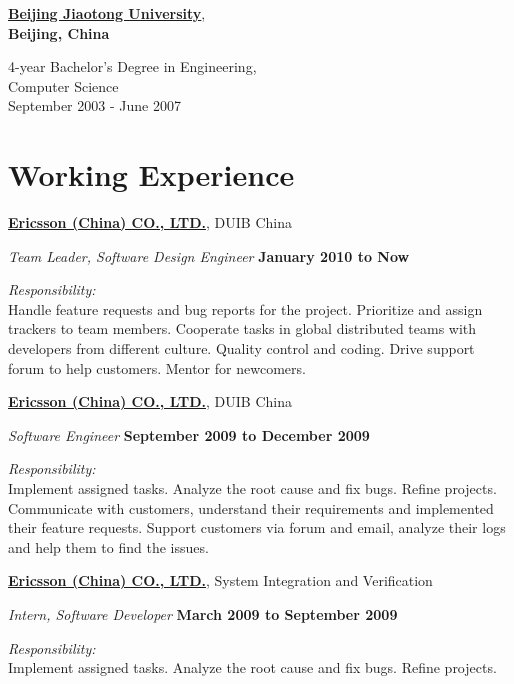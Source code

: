 \href{http://www.njtu.edu.cn/en/}{\textbf{Beijing Jiaotong University}},\\
\textbf{Beijing, China}
\begin{outerlist}
\item[] 4-year Bachelor's Degree in Engineering, \\
        {Computer Science}\\
        September 2003 - June 2007
\end{outerlist}       

%
\section{Working Experience}
\href{http://www.ericsson.com/cn}{\textbf{Ericsson (China) CO., LTD.}}, {DUIB China}
\begin{outerlist}
\item[] \textit{Team Leader, Software Design Engineer}%
        \hfill \textbf{January 2010 to Now}
\begin{outerlist}
\item \textit{Responsibility:}\\
Handle feature requests and bug reports for the project.
Prioritize and assign trackers to team members.
Cooperate tasks in global distributed teams with developers from different culture. Quality control and coding. Drive support forum to help customers. 
Mentor for newcomers.
\end{outerlist}
\end{outerlist}
\blankline

\href{http://www.ericsson.com/cn}{\textbf{Ericsson (China) CO., LTD.}}, {DUIB China}
\begin{outerlist}
\item[] \textit{Software Engineer}%
        \hfill \textbf{September 2009 to December 2009}
\begin{outerlist}
\item \textit{Responsibility:}\\
Implement assigned tasks. Analyze the root cause and fix bugs.
Refine projects. Communicate with customers, understand their requirements and implemented their feature requests. Support customers via forum and email, analyze their logs and help them to find the issues.
\end{outerlist}
\end{outerlist}
\blankline

%
\href{http://www.ericsson.com/cn}{\textbf{Ericsson (China) CO., LTD.}}, {System Integration and Verification}
\begin{outerlist}

\item[] \textit{Intern, Software Developer}%
        \hfill \textbf{March 2009 to September 2009}
\begin{outerlist}
\item \textit{Responsibility:}\\
Implement assigned tasks. Analyze the root cause and fix bugs.
Refine projects.
\end{outerlist}
\end{outerlist}
\blankline

